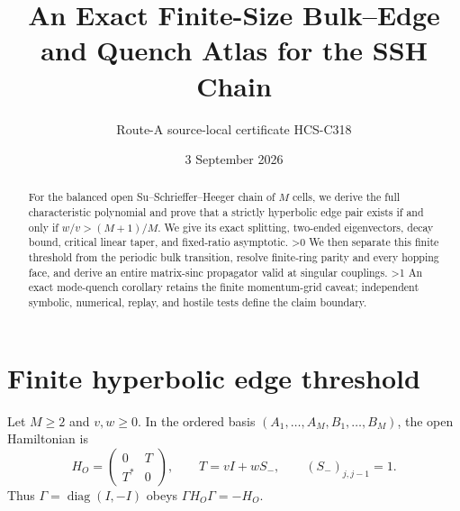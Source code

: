 \documentclass[10pt]{article}
\title{An Exact Finite-Size Bulk--Edge and Quench Atlas for the SSH Chain}
\author{Route-A source-local certificate HCS-C318}
\date{3 September 2026}
\providecommand{\CRevisionRound}{2}
\begin{document}
\maketitle
\begin{abstract}
For the balanced open Su--Schrieffer--Heeger chain of $M$ cells, we derive
the full characteristic polynomial and prove that a strictly hyperbolic
edge pair exists if and only if $w/v>(M+1)/M$.  We give its exact splitting,
two-ended eigenvectors, decay bound, critical linear taper, and fixed-ratio
asymptotic.
\ifnum\CRevisionRound>0
We then separate this finite threshold from the periodic bulk transition,
resolve finite-ring parity and every hopping face, and derive an entire
matrix-sinc propagator valid at singular couplings.
\fi
\ifnum\CRevisionRound>1
An exact mode-quench corollary retains the finite momentum-grid caveat;
independent symbolic, numerical, replay, and hostile tests define the claim
boundary.
\fi
\end{abstract}

\section{Finite hyperbolic edge threshold}
Let $M\geq2$ and $v,w\geq0$.  In the ordered basis
$(A_1,\ldots,A_M,B_1,\ldots,B_M)$, the open Hamiltonian is
\begin{equation}\label{eq:block}
 H_O=\begin{pmatrix}0&T\\T^*&0\end{pmatrix},\qquad
 T=vI+wS_-,\qquad (S_-)_{j,j-1}=1.
\end{equation}
Thus $\Gamma=\operatorname{diag}(I,-I)$ obeys
$\Gamma H_O\Gamma=-H_O$.
\end{document}
